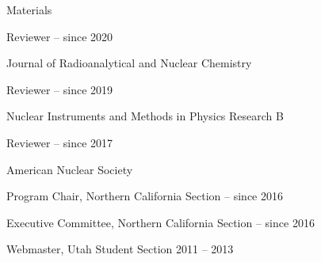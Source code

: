 \begin{list1}
\item[] Materials
\begin{list2}
\item Reviewer \hfill{ -- since 2020}
\end{list2}
\item[] Journal of Radioanalytical and Nuclear Chemistry
\begin{list2}
\item Reviewer \hfill{ -- since 2019}
\end{list2}
\item[] Nuclear Instruments and Methods in Physics Research B  
\begin{list2}
\item Reviewer \hfill{ -- since 2017}
\end{list2}
\item[] American Nuclear Society  
\begin{list2}
\item Program Chair, Northern California Section \hfill{ -- since 2016}
\item Executive Committee, Northern California Section \hfill{ -- since 2016}
\item Webmaster, Utah Student Section \hfill{2011 --  2013}
\end{list2}
\end{list1}
